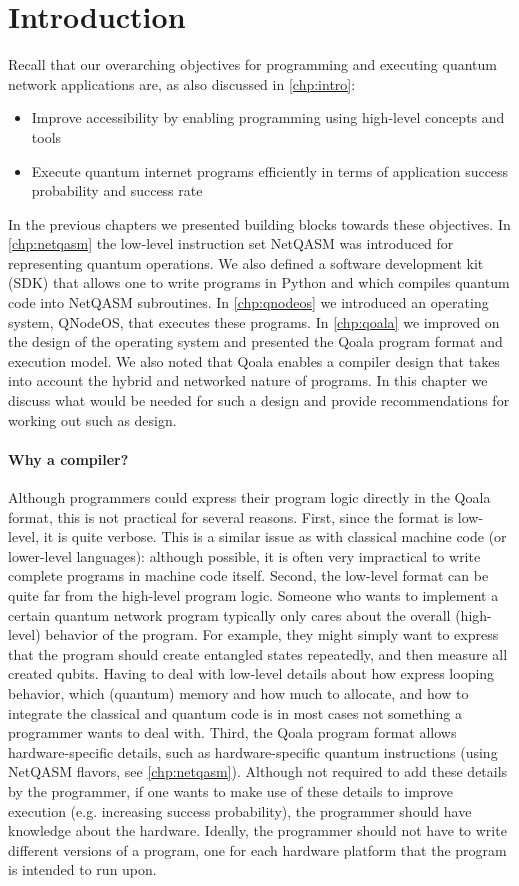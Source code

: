 \section{Introduction}

Recall that our overarching objectives for programming and executing quantum network applications are, as also discussed in \cref{chp:intro}:
\begin{itemize}
\item Improve accessibility by enabling programming using high-level concepts and tools
\item Execute quantum internet programs efficiently in terms of application success probability and success rate
\end{itemize}

In the previous chapters we presented building blocks towards these objectives.
In \cref{chp:netqasm} the low-level instruction set NetQASM was introduced for representing quantum operations.
We also defined a software development kit (SDK) that allows one to write programs in Python and which compiles quantum code into NetQASM subroutines.
In \cref{chp:qnodeos} we introduced an operating system, QNodeOS, that executes these programs.
In \cref{chp:qoala} we improved on the design of the operating system and presented the Qoala program format and execution model.
We also noted that Qoala enables a compiler design that takes into account the hybrid and networked nature of programs.
In this chapter we discuss what would be needed for such a design and provide recommendations for working out such as design.

\paragraph{Why a compiler?}
Although programmers could express their program logic directly in the Qoala format, this is not practical for several reasons.
First, since the format is low-level, it is quite verbose.
This is a similar issue as with classical machine code (or lower-level languages): although possible, it is often very impractical to write complete programs in machine code itself.
Second, the low-level format can be quite far from the high-level program logic.
Someone who wants to implement a certain quantum network program typically only cares about the overall (high-level) behavior of the program.
For example, they might simply want to express that the program should create entangled states repeatedly, and then measure all created qubits.
Having to deal with low-level details about how express looping behavior, which (quantum) memory and how much to allocate, and how to integrate the classical and quantum code
is in most cases not something a programmer wants to deal with. 
Third, the Qoala program format allows hardware-specific details, such as hardware-specific quantum instructions (using NetQASM flavors, see \cref{chp:netqasm}).
Although not required to add these details by the programmer, if one wants to make use of these details to improve execution (e.g. increasing success probability), the programmer should have knowledge about the hardware.
Ideally, the programmer should not have to write different versions of a program, one for each hardware platform that the program is intended to run upon.

